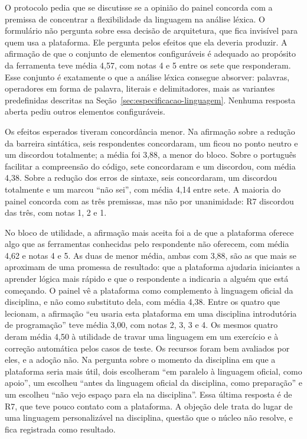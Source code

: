 O protocolo pedia que se discutisse se a opinião do painel concorda com a premissa de concentrar a flexibilidade da linguagem na análise léxica. O formulário não pergunta sobre essa decisão de arquitetura, que fica invisível para quem usa a plataforma. Ele pergunta pelos efeitos que ela deveria produzir. A afirmação de que o conjunto de elementos configuráveis é adequado ao propósito da ferramenta teve média 4,57, com notas 4 e 5 entre os sete que responderam. Esse conjunto é exatamente o que a análise léxica consegue absorver: palavras, operadores em forma de palavra, literais e delimitadores, mais as variantes predefinidas descritas na Seção~\ref{sec:especificacao-linguagem}. Nenhuma resposta aberta pediu outros elementos configuráveis.

Os efeitos esperados tiveram concordância menor. Na afirmação sobre a redução da barreira sintática, seis respondentes concordaram, um ficou no ponto neutro e um discordou totalmente; a média foi 3,88, a menor do bloco. Sobre o português facilitar a compreensão do código, sete concordaram e um discordou, com média 4,38. Sobre a redução dos erros de sintaxe, seis concordaram, um discordou totalmente e um marcou ``não sei'', com média 4,14 entre sete. A maioria do painel concorda com as três premissas, mas não por unanimidade: R7 discordou das três, com notas 1, 2 e 1.

No bloco de utilidade, a afirmação mais aceita foi a de que a plataforma oferece algo que as ferramentas conhecidas pelo respondente não oferecem, com média 4,62 e notas 4 e 5. As duas de menor média, ambas com 3,88, são as que mais se aproximam de uma promessa de resultado: que a plataforma ajudaria iniciantes a aprender lógica mais rápido e que o respondente a indicaria a alguém que está começando. O painel vê a plataforma como complemento à linguagem oficial da disciplina, e não como substituto dela, com média 4,38. Entre os quatro que lecionam, a afirmação ``eu usaria esta plataforma em uma disciplina introdutória de programação'' teve média 3,00, com notas 2, 3, 3 e 4. Os mesmos quatro deram média 4,50 à utilidade de travar uma linguagem em um exercício e à correção automática pelos casos de teste. Os recursos foram bem avaliados por eles, e a adoção não. Na pergunta sobre o momento da disciplina em que a plataforma seria mais útil, dois escolheram ``em paralelo à linguagem oficial, como apoio'', um escolheu ``antes da linguagem oficial da disciplina, como preparação'' e um escolheu ``não vejo espaço para ela na disciplina''. Essa última resposta é de R7, que teve pouco contato com a plataforma. A objeção dele trata do lugar de uma linguagem personalizável na disciplina, questão que o núcleo não resolve, e fica registrada como resultado.

